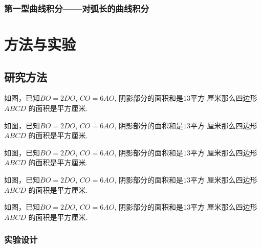 \documentclass{USTBBook}
\begin{document}
\cleardoublepage
\section{第一型曲线积分——对弧长的曲线积分}
\zhlipsum[9]

\part{方法与实验}


\chapter{研究方法} \label{cha:1}

\begin{question}
  如图，已知$BO=2DO$, $CO=6AO$, 阴影部分的面积和是$13$平方
  厘米那么四边形 $ABCD$ 的面积是\fillin[]平方厘米.
\end{question}

\begin{question}
  如图，已知$BO=2DO$, $CO=6AO$, 阴影部分的面积和是$13$平方
  厘米那么四边形 $ABCD$ 的面积是\fillin[]平方厘米.
\end{question}

\begin{question}
  如图，已知$BO=2DO$, $CO=6AO$, 阴影部分的面积和是$13$平方
  厘米那么四边形 $ABCD$ 的面积是\fillin[]平方厘米.
\end{question}

\begin{question}
  如图，已知$BO=2DO$, $CO=6AO$, 阴影部分的面积和是$13$平方
  厘米那么四边形 $ABCD$ 的面积是\fillin[]平方厘米.
\end{question}

\begin{solution}
  如图，已知$BO=2DO$, $CO=6AO$, 阴影部分的面积和是$13$平方
  厘米那么四边形 $ABCD$ 的面积是\fillin[]平方厘米.
\end{solution}

\section{实验设计}
\zhlipsum[11]
\end{document}
